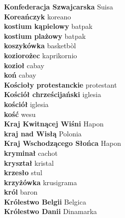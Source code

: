 \textbf{ Konfederacja Szwajcarska  } Suisa \\
\textbf{ Koreańczyk  } koreano \\
\textbf{ kostium kąpielowy  } batpak \\
\textbf{ kostium plażowy  } batpak \\
\textbf{ koszykówka  } basketbòl \\
\textbf{ koziorożec  } kaprikornio \\
\textbf{ kozioł  } cabay \\
\textbf{ koń  } cabay \\
\textbf{ Kościoły protestanckie  } protestant \\
\textbf{ Kościół chrześcijański  } iglesia \\
\textbf{ kościół  } iglesia \\
\textbf{ kość  } wesu \\
\textbf{ Kraj Kwitnącej Wiśni  } Hapon \\
\textbf{ kraj nad Wisłą  } Polonia \\
\textbf{ Kraj Wschodzącego Słońca  } Hapon \\
\textbf{ kryminał  } cachot \\
\textbf{ kryształ  } kristal \\
\textbf{ krzesło  } stul \\
\textbf{ krzyżówka  } krusigrama \\
\textbf{ król  } baron \\
\textbf{ Królestwo Belgii  } Belgica \\
\textbf{ Królestwo Danii  } Dinamarka \\

